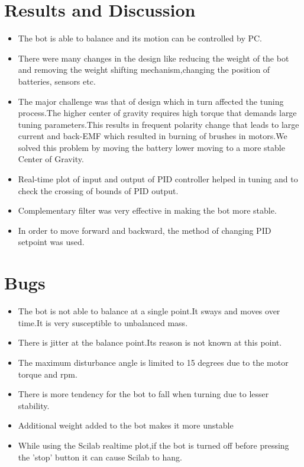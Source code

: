 \documentclass[report]{res}
\begin{document}
	
	\section{\large Results and Discussion}
	\begin{itemize}
		\item The bot is able to balance and its motion can be controlled by PC.
		\item There were many changes in the design like reducing the weight of the bot and removing the weight shifting mechanism,changing the position of batteries, sensors etc.
		\item The major challenge was that of design which in turn affected the tuning process.The higher center of gravity requires high torque that demands large tuning parameters.This results in frequent polarity change that leads to large current and back-EMF which resulted in burning of brushes in motors.We solved this problem by moving the battery lower moving to a more stable Center of Gravity. 
		\item Real-time plot of input and output of PID controller helped in tuning and to check the crossing of bounds of PID output.
		\item Complementary filter was very effective in making the bot more stable.
		\item In order to move forward and backward, the method of changing PID setpoint was used.
	\end{itemize}
	
	
	\section{\large Bugs}
	\begin{itemize}
		\item The bot is not able to balance at a single point.It sways and moves over time.It is very susceptible to unbalanced mass.
		\item There is jitter at the balance point.Its reason is not known at this point.
		\item The maximum disturbance angle is limited to 15 degrees due to the motor torque and rpm.
		\item There is more tendency for the bot to fall when turning due to lesser stability. 
		\item Additional weight added to the bot makes it more unstable
		\item While using the Scilab realtime plot,if the bot is turned off before pressing the 'stop' button it can cause Scilab to hang.
	\end{itemize}
	
\end{document}
